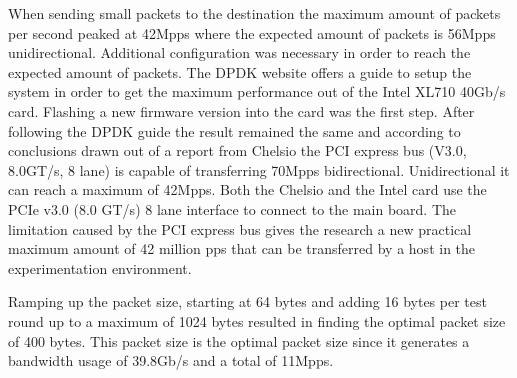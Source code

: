 When sending small packets to the destination the maximum amount of packets per second peaked at 42Mpps where the expected amount of packets is 56Mpps unidirectional. 
Additional configuration was necessary in order to reach the expected amount of packets.
The DPDK website offers a guide \cite{intelguidedpdk} to setup the system in order to get the maximum performance out of the Intel XL710 40Gb/s card. 
Flashing a new firmware version into the card was the first step. 
After following the DPDK guide the result remained the same and according to conclusions drawn out of a report from Chelsio \cite{chelsio} the PCI express bus (V3.0, 8.0GT/s, 8 lane) is capable of transferring 70Mpps bidirectional. 
Unidirectional it can reach a maximum of 42Mpps.
Both the Chelsio\cite{t580} and the Intel\cite{xl710} card use the PCIe v3.0 (8.0 GT/s) 8 lane interface to connect to the main board.
The limitation caused by the PCI express bus gives the research a new practical maximum amount of 42 million pps that can be transferred by a host in the experimentation environment.
   
Ramping up the packet size, starting at 64 bytes and adding 16 bytes per test round up to a maximum of 1024 bytes resulted in finding the optimal packet size of 400 bytes. 
This packet size is the  optimal packet size since it generates a bandwidth usage of 39.8Gb/s and a total of 11Mpps. 



